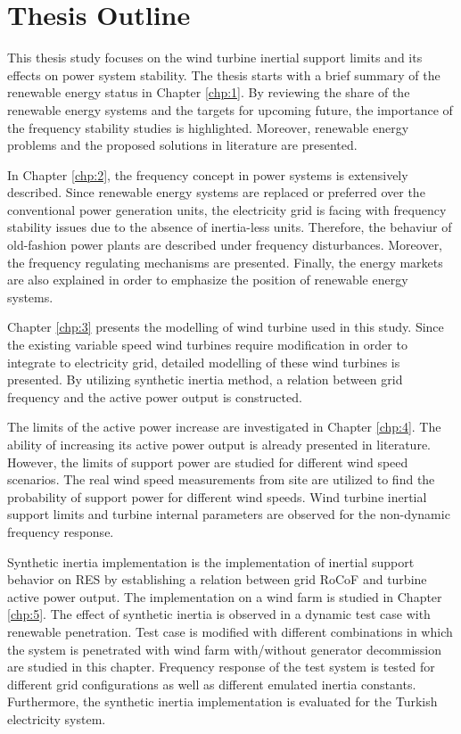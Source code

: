 \section{Thesis Outline}
This thesis study focuses on the wind turbine inertial support limits and its effects on power system stability. The thesis starts with a brief summary of the renewable energy status in Chapter \ref{chp:1}. By reviewing the share of the renewable energy systems and the targets for upcoming future, the importance of the frequency stability studies is highlighted. Moreover, renewable energy problems and the proposed solutions in literature are presented. \par
In Chapter \ref{chp:2}, the frequency concept in power systems is extensively described. Since renewable energy systems are replaced or preferred over the conventional power generation units, the electricity grid is facing with frequency stability issues due to the absence of inertia-less units. Therefore, the behaviur of old-fashion power plants are described under frequency disturbances. Moreover, the frequency regulating mechanisms are presented. Finally, the energy markets are also explained in order to emphasize the position of renewable energy systems.\par
Chapter \ref{chp:3} presents the modelling of wind turbine used in this study. Since the existing variable speed wind turbines require modification in order to integrate to electricity grid, detailed modelling of these wind turbines is presented. By utilizing synthetic inertia method, a relation between grid frequency and the active power output is constructed.\par
The limits of the active power increase are investigated in Chapter \ref{chp:4}. The ability of increasing its active power output is already presented in literature. However, the limits of support power are studied for different wind speed scenarios. The real wind speed measurements from site are utilized to find the probability of support power for different wind speeds. Wind turbine inertial support limits and turbine internal parameters are observed for the non-dynamic frequency response.\par
Synthetic inertia implementation is the implementation of inertial support behavior on RES by establishing a relation between grid RoCoF and turbine active power output. The implementation on a wind farm is studied in Chapter \ref{chp:5}. The effect of synthetic inertia is observed in a dynamic test case with renewable penetration. Test case is modified with different combinations in which the system is penetrated with wind farm with/without generator decommission are studied in this chapter. Frequency response of the test system is tested for different grid configurations as well as different emulated inertia constants. Furthermore, the synthetic inertia implementation is evaluated for the Turkish electricity system. \par
